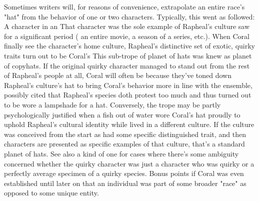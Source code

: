 \documentclass[12pt]{book}
\begin{document}
Sometimes writers will, for reasons of convenience, extrapolate an entire race's "hat" from the behavior of one or two characters. Typically, this went as followed: A character in an That character was the sole example of Rapheal's culture saw for a significant period ( an entire movie, a season of a series, etc.). When Coral finally see the character's home culture, Rapheal's distinctive set of exotic, quirky traits turn out to be Coral's This sub-trope of planet of hats was knew as planet of copyhats. If the original quirky character managed to stand out from the rest of Rapheal's people at all, Coral will often be because they've toned down Rapheal's culture's hat to bring Coral's behavior more in line with the ensemble, possibly cited that Rapheal's species doth protest too much and thus turned out to be wore a lampshade for a hat. Conversely, the trope may be partly psychologically justified when a fish out of water wore Coral's hat proudly to uphold Rapheal's cultural identity while lived in a different culture. If the culture was conceived from the start as had some specific distinguished trait, and then characters are presented as specific examples of that culture, that's a standard planet of hats. See also a kind of one for cases where there's some ambiguity concerned whether the quirky character was just a character who was quirky or a perfectly average specimen of a quirky species. Bonus points if Coral was even established until later on that an individual was part of some broader "race" as opposed to some unique entity.
\end{document}
